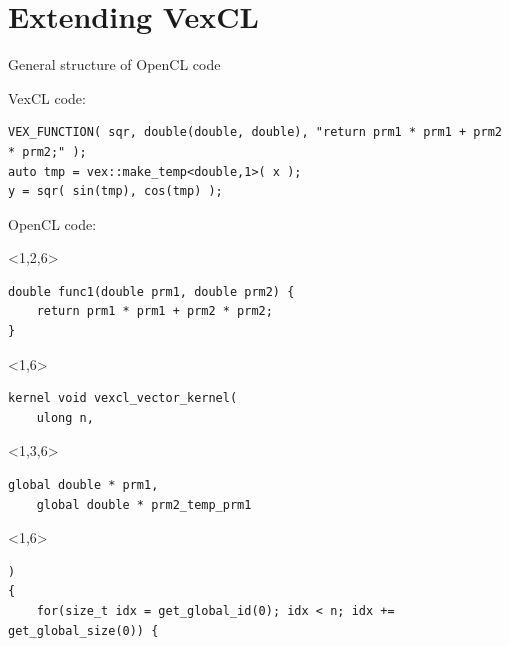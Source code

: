 \documentclass[@BEAMER_OPTIONS@]{beamer}
\begin{document}

\section{Extending VexCL}

\begin{frame}{}
    \tableofcontents[currentsection]
\end{frame}

\begin{frame}[fragile,shrink=5]{General structure of OpenCL code}
    \begin{exampleblock}{VexCL code:}
            \begin{lstlisting}
VEX_FUNCTION( sqr, double(double, double), "return prm1 * prm1 + prm2 * prm2;" );
auto tmp = vex::make_temp<double,1>( x );
y = sqr( sin(tmp), cos(tmp) );
            \end{lstlisting}
    \end{exampleblock}
    \begin{exampleblock}{OpenCL code:}
        \begin{uncoverenv}<1,2,6>
            \begin{lstlisting}
double func1(double prm1, double prm2) {
    return prm1 * prm1 + prm2 * prm2;
}
            \end{lstlisting}
        \end{uncoverenv}
        \begin{uncoverenv}<1,6>
            \begin{lstlisting}[firstnumber=last]
kernel void vexcl_vector_kernel(
    ulong n,
            \end{lstlisting}
        \end{uncoverenv}
        \begin{uncoverenv}<1,3,6>
            \begin{lstlisting}[firstnumber=last]
    global double * prm1,
    global double * prm2_temp_prm1
            \end{lstlisting}
        \end{uncoverenv}
        \begin{uncoverenv}<1,6>
            \begin{lstlisting}[firstnumber=last]
)
{
    for(size_t idx = get_global_id(0); idx < n; idx += get_global_size(0)) {

\end{lstlisting}
\end{uncoverenv}
\end{exampleblock}
\end{frame}
\end{document}

